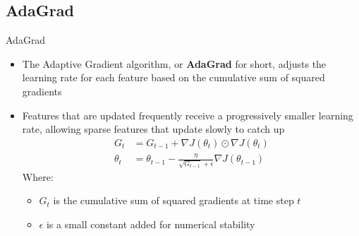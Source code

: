 \documentclass[serif, aspectratio=169]{beamer}
\begin{document}

\subsection{AdaGrad}
\begin{frame}{AdaGrad}
       \begin{itemize}
    \item The Adaptive Gradient algorithm, or \textbf{AdaGrad} for short, adjusts the learning rate for each feature based on the cumulative sum of squared gradients
    \item Features that are updated frequently receive a progressively smaller learning rate, allowing sparse features that update slowly to catch up
        \begin{align*}
        G_t &= G_{t-1} + \nabla J(\theta_t) \odot \nabla J(\theta_t) \\
        \theta_{t} &= \theta_{t-1}- \frac{\eta}{\sqrt{G_{t-1}} + \epsilon} \nabla J(\theta_{t-1})
        \end{align*}
        Where:
        \begin{itemize}
            \item $G_t$ is the cumulative sum of squared gradients at time step $t$
            \item $\epsilon$ is a small constant added for numerical stability
        \end{itemize}
    \end{itemize}
\end{frame}
\end{document}
